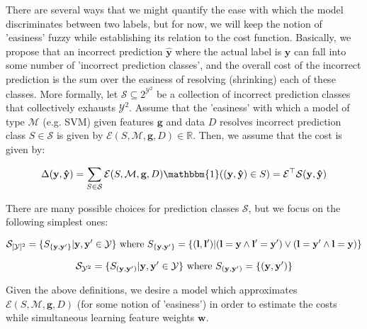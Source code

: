 \documentclass{article} %
\begin{document}
There are several ways that we might quantify 
the ease with which the model discriminates between two labels,
but for now, we will keep the notion of 'easiness' fuzzy while
establishing its relation to the cost function.
Basically, we propose that an incorrect prediction 
$\mathbf{\hat{y}}$ where the actual label is $\mathbf{y}$ can 
fall into some number of 'incorrect prediction classes', and
the overall cost of the incorrect prediction is the sum over the
easiness of resolving (shrinking) each of these classes.  More
formally, let $\mathcal{S}\subseteq 2^{\mathcal{Y}^2}$ be a 
collection of incorrect prediction classes that collectively 
exhausts $\mathcal{Y}^2$.  Assume that the 'easiness' with 
which a model of type $\mathcal{M}$ (e.g. SVM) given features 
$\mathbf{g}$ and data $D$ resolves incorrect prediction 
class $S\in\mathcal{S}$ is given by 
$\mathcal{E}(S,\mathcal{M},\mathbf{g},D)\in\mathbb{R}$.
Then, we assume that the cost is given by:

\begin{equation}
\Delta(\mathbf{y},\mathbf{\hat{y}})=\sum_{S\in\mathcal{S}}\mathcal{E}(S,\mathcal{M},\mathbf{g}, D)\mathbbm{1}((\mathbf{y},\mathbf{\hat{y}})\in S)=
\mathbf{\mathcal{E}}^\top \mathbf{\mathcal{S}}(\mathbf{y},\mathbf{\hat{y}})
\end{equation}

There are many possible choices for prediction classes $\mathcal{S}$, but
we focus on the following simplest ones:

\begin{equation}
\mathcal{S}_{[\mathcal{Y}]^2} = \{ S_{\{\mathbf{y},\mathbf{y}'\}} | \mathbf{y},\mathbf{y}'\in\mathcal{Y}\}\text{ where }S_{\{\mathbf{y},\mathbf{y}'\}}=\{ (\mathbf{l}, \mathbf{l}') | (\mathbf{l}=\mathbf{y}\wedge \mathbf{l}'=\mathbf{y}')\vee(\mathbf{l}=\mathbf{y}'\wedge \mathbf{l}=\mathbf{y}) \} \\
\end{equation}

\begin{equation}
\mathcal{S}_{\mathcal{Y}^2} = \{ S_{(\mathbf{y},\mathbf{y}')} | \mathbf{y},\mathbf{y}'\in\mathcal{Y}\}\text{ where }S_{(\mathbf{y},\mathbf{y}')}=\{ (\mathbf{y},\mathbf{y}') \} \\
\end{equation}

Given the above definitions, we desire a model which approximates 
$\mathcal{E}(S,\mathcal{M},\mathbf{g}, D)$ (for some notion of 'easiness')
in order to estimate the costs while simultaneous learning feature 
weights $\mathbf{w}$.  
\end{document}
